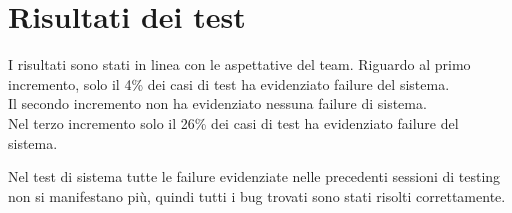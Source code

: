 \chapter{Risultati dei test}
I risultati sono stati in linea con le aspettative del team.
Riguardo al primo incremento, solo il 4\% dei casi di test ha evidenziato failure del sistema.\\
Il secondo incremento non ha evidenziato nessuna failure di sistema.\\
Nel terzo incremento solo il 26\% dei casi di test ha evidenziato failure del sistema.

Nel test di sistema tutte le failure evidenziate nelle precedenti sessioni di testing non si manifestano più, quindi tutti i bug trovati sono stati risolti correttamente.